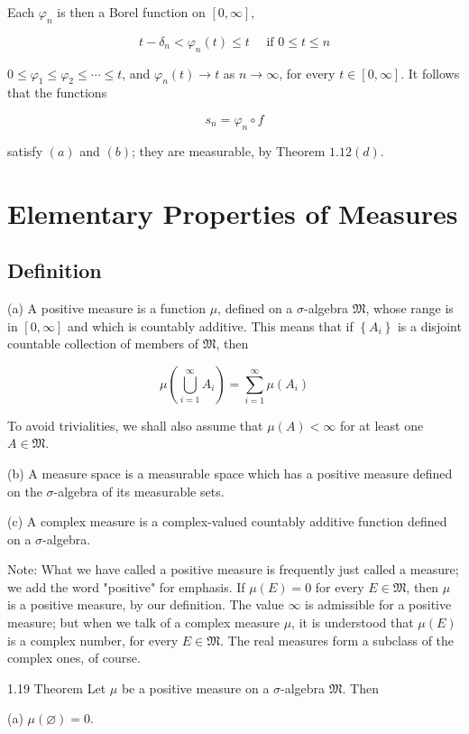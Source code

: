 \documentclass[10pt]{article}
\begin{document}
Each $\varphi_{n}$ is then a Borel function on $[0, \infty]$,

$$
t-\delta_{n}<\varphi_{n}(t) \leq t \quad \text { if } 0 \leq t \leq n
$$

$0 \leq \varphi_{1} \leq \varphi_{2} \leq \cdots \leq t$, and $\varphi_{n}(t) \rightarrow t$ as $n \rightarrow \infty$, for every $t \in[0, \infty]$. It follows that the functions

$$
s_{n}=\varphi_{n} \circ f
$$

satisfy $(a)$ and $(b)$; they are measurable, by Theorem $1.12(d)$.

\section{Elementary Properties of Measures}
\subsection{Definition}
(a) A positive measure is a function $\mu$, defined on a $\sigma$-algebra $\mathfrak{M}$, whose range is in $[0, \infty]$ and which is countably additive. This means that if $\left\{A_{i}\right\}$ is a disjoint countable collection of members of $\mathfrak{M}$, then

$$
\mu\left(\bigcup_{i=1}^{\infty} A_{i}\right)=\sum_{i=1}^{\infty} \mu\left(A_{i}\right)
$$

To avoid trivialities, we shall also assume that $\mu(A)<\infty$ for at least one $A \in \mathfrak{M}$.

(b) A measure space is a measurable space which has a positive measure defined on the $\sigma$-algebra of its measurable sets.

(c) A complex measure is a complex-valued countably additive function defined on a $\sigma$-algebra.

Note: What we have called a positive measure is frequently just called a measure; we add the word "positive" for emphasis. If $\mu(E)=0$ for every $E \in \mathfrak{M}$, then $\mu$ is a positive measure, by our definition. The value $\infty$ is admissible for a positive measure; but when we talk of a complex measure $\mu$, it is understood that $\mu(E)$ is a complex number, for every $E \in \mathfrak{M}$. The real measures form a subclass of the complex ones, of course.

1.19 Theorem Let $\mu$ be a positive measure on a $\sigma$-algebra $\mathfrak{M}$. Then

(a) $\mu(\varnothing)=0$.
\end{document}
